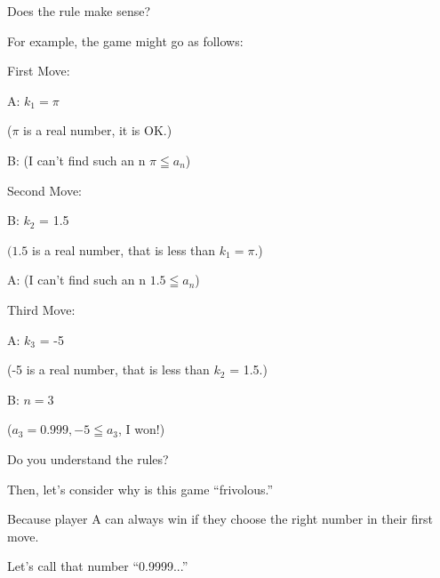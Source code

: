 \begin{frame}[c]{}{}
  Does the rule make sense?

  \vspace{4ex}

  For example, the game might go as follows:
\end{frame}

\begin{frame}[c]{}{}
  First Move:

  \vspace{4ex}

  A: $k_1 = \pi$

  ($\pi$ is a real number, it is OK.)

  \vspace{2ex}

  B: (I can't find such an n $\pi \leqq a_n$)
\end{frame}

\begin{frame}[c]{}{}
  Second Move:

  \vspace{4ex}

  B: $k_2$ = 1.5

  $(1.5$ is a real number, that is less than $k_1 = \pi$.)

  \vspace{2ex}

  A: (I can't find such an n $1.5 \leqq a_n$)
\end{frame}

\begin{frame}[c]{}{}
  Third Move:

  \vspace{4ex}

  A: $k_3$ = -5

  (-5 is a real number, that is less than $k_2$ = 1.5.)

  \vspace{2ex}

  B: $n = 3$

  ($a_3 = 0.999, -5 \leqq a_3$, I won!)
\end{frame}

\begin{frame}[c]{}{}
  Do you understand the rules?
\end{frame}

\begin{frame}[c]{}{}
  Then, let's consider why is this game ``frivolous.''
\end{frame}

\begin{frame}[c]{}{}
  Because player A can always win if they choose the right number in their first move.

  \vspace{4ex}

  Let's call that number ``0.9999...''
\end{frame}

